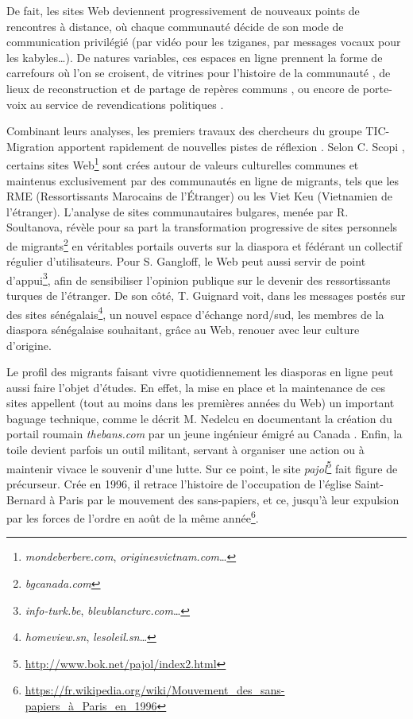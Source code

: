 \documentclass[symmetric,justified,marginals=raggedouter]{tufte-book}
\begin{document}
De fait, les sites Web deviennent progressivement de nouveaux points de rencontres à distance, où chaque communauté décide de son mode de communication privilégié (par vidéo pour les tziganes, par messages vocaux pour les kabyles\ldots{}). De natures variables, ces espaces en ligne prennent la forme de carrefours où l'on se croisent, de vitrines pour l'histoire de la communauté \citep{whitaker_tamilnet._2004}, de lieux de reconstruction et de partage de repères communs \citep{sabancioglu_new_2011}, ou encore de porte-voix au service de revendications politiques \citep{kumar_rerouting_2018}.

Combinant leurs analyses, les premiers travaux des chercheurs du groupe TIC-Migration apportent rapidement de nouvelles pistes de réflexion \citep{laflaquiere_archiver_2005}. Selon C. Scopi \citep{scopsi_les_2009}, certains sites Web\footnote{\RaggedOuter \textit{mondeberbere.com}, \textit{originesvietnam.com}\ldots{}} sont crées autour de valeurs culturelles communes et maintenus exclusivement par des communautés en ligne de migrants, tels que les RME (Ressortissants Marocains de l'Étranger) ou les Viet Keu (Vietnamien de l'étranger). L'analyse de sites communautaires bulgares, menée par R. Soultanova, révèle pour sa part la transformation progressive de sites personnels de migrants\footnote{\RaggedOuter \textit{bgcanada.com}} en véritables portails ouverts sur la diaspora et fédérant un collectif régulier d'utilisateurs.  Pour S. Gangloff, le Web peut aussi servir de point d'appui\footnote{\RaggedOuter \textit{info-turk.be}, \textit{bleublancturc.com}\ldots{}}, afin de sensibiliser l'opinion publique sur le devenir des ressortissants turques de l'étranger. De son côté, T. Guignard voit, dans les messages postés sur des sites sénégalais\footnote{\RaggedOuter \textit{homeview.sn}, \textit{lesoleil.sn}\ldots{}}, un nouvel espace d'échange nord/sud, les membres de la diaspora sénégalaise souhaitant, grâce au Web, renouer avec leur culture d'origine. 

Le profil des migrants faisant vivre quotidiennement les diasporas en ligne peut aussi faire l'objet d'études. En effet, la mise en place et la maintenance de ces sites appellent (tout au moins dans les premières années du Web) un important baguage technique, comme le décrit M. Nedelcu en documentant la création du portail roumain \textit{thebans.com} par un jeune ingénieur émigré au Canada \citep{nedelcu_e-communautarisme_2003}. Enfin, la toile devient parfois un outil militant, servant à organiser une action ou à maintenir vivace le souvenir d'une lutte. Sur ce point, le site \textit{pajol}\footnote{\RaggedOuter \url{http://www.bok.net/pajol/index2.html}} fait figure de précurseur. Crée en 1996, il retrace l'histoire de l'occupation de l'église Saint-Bernard à Paris par le mouvement des sans-papiers, et ce, jusqu'à leur expulsion par les forces de l'ordre en août de la même année\footnote{\RaggedOuter \url{https://fr.wikipedia.org/wiki/Mouvement_des_sans-papiers_à_Paris_en_1996}}.
\end{document}
